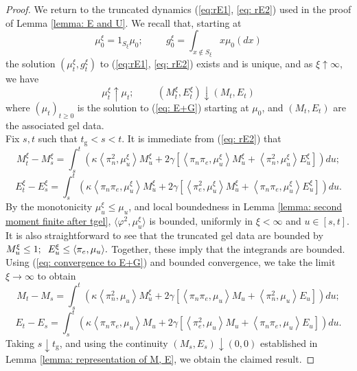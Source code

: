 \documentclass[11pt, notitlepage]{article}
\begin{document}
\begin{proof} We return to the truncated dynamics (\ref{eq:rE1}, \ref{eq: rE2}) used in the proof of Lemma \ref{lemma: E and U}. We recall that, starting at \begin{equation} \mu^\xi_0 = 1_{S_\xi}\mu_0; \hspace{1cm} g^\xi_0=\int_{x\not\in S_\xi} x\mu_0(dx)\end{equation} the solution $(\mu^\xi_t, g^\xi_t)$ to (\ref{eq:rE1}, \ref{eq: rE2}) exists and is unique, and as $\xi\uparrow \infty$, we have \begin{equation} \label{eq: convergence to E+G}
    \mu^\xi_t\uparrow \mu_t; \hspace{1cm} (M^\xi_t, E^\xi_t)\downarrow (M_t, E_t)
\end{equation} where $(\mu_t)_{t\ge 0}$ is the solution to (\ref{eq: E+G}) starting at $\mu_0$, and $(M_t, E_t)$ are the associated gel data. \medskip \\ Fix $s, t$ such that $t_\mathrm{g}<s<t$. It is immediate from (\ref{eq: rE2}) that \begin{equation}
    M^\xi_t-M^\xi_s=\int_{s}^t 
    \left(
      \kappa \left<\pi_n^2,\mu^\xi_u\right>M^\xi_u +
      2\gamma \left[
        \left<\pi_n \pi_e,\mu^\xi_u \right>M^\xi_u +
        \left<\pi_n^2,\mu^\xi_u \right>E^\xi_u \right]
    \right)du;
\end{equation}
\begin{equation}
    E^\xi_t-E^\xi_s=\int_{s}^t 
    \left(
      \kappa \left<\pi_n \pi_e,\mu^\xi_u\right>M^\xi_u +
      2\gamma \left[
        \left<\pi_e^2,\mu^\xi_u \right>M^\xi_u +
        \left<\pi_n \pi_e,\mu^\xi_u \right>E^\xi_u \right]
    \right)du.
\end{equation} By the monotonicity $\mu^\xi_u \le \mu_u$, and local boundedness in Lemma \ref{lemma: second moment finite after tgel},  $\langle \varphi^2, \mu^\xi_u\rangle $ is bounded, uniformly in $\xi<\infty$ and $u\in [s,t]$. It is also  straightforward to see that the truncated gel data are bounded by $M^\xi_u \le 1;\hspace{0.2cm} E^\xi_u \le \langle \pi_e, \mu_u\rangle.$ Together, these imply that the integrands are bounded. Using (\ref{eq: convergence to E+G}) and bounded convergence, we take the limit $\xi \rightarrow \infty$ to obtain  \begin{equation}
    M_t-M_s=\int_{s}^t 
    \left(
      \kappa \left<\pi_n^2,\mu_u\right>M^\xi_u +
      2\gamma \left[
        \left<\pi_n \pi_e,\mu_u \right>M_u +
        \left<\pi_n^2,\mu_u \right>E_u \right]
    \right)du;
\end{equation}
\begin{equation}
    E_t-E_s=\int_{s}^t 
    \left(
      \kappa \left<\pi_n \pi_e,\mu_u\right>M_u +
      2\gamma \left[
        \left<\pi_e^2,\mu_u \right>M_u +
        \left<\pi_n \pi_e,\mu_u \right>E_u \right]
    \right)du.
\end{equation} Taking $s\downarrow t_\mathrm{g}$, and using the continuity $(M_s, E_s)\downarrow (0,0)$ established in Lemma \ref{lemma: representation of M, E}, we obtain the claimed result. \end{proof}
\end{document}
